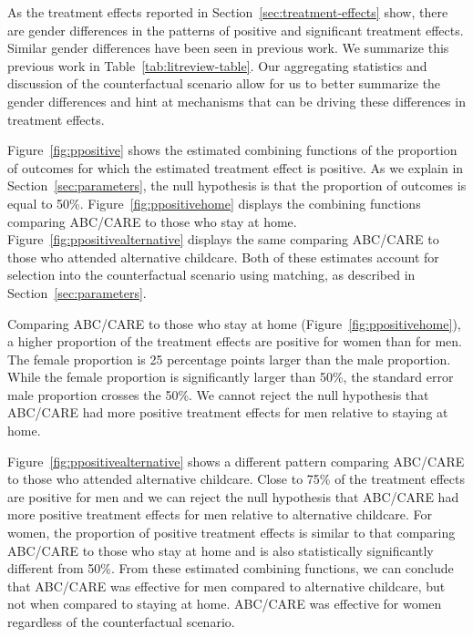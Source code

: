 
As the treatment effects reported in Section~\ref{sec:treatment-effects} show, there are gender differences in the patterns of positive and significant treatment effects. Similar gender differences have been seen in previous work. We summarize this previous work in Table~\ref{tab:litreview-table}. Our aggregating statistics and discussion of the counterfactual scenario allow for us to better summarize the gender differences and hint at mechanisms that can be driving these differences in treatment effects.

Figure~\ref{fig:ppositive} shows the estimated combining functions of the proportion of outcomes for which the estimated treatment effect is positive. As we explain in Section~\ref{sec:parameters}, the null hypothesis is that the proportion of outcomes is equal to 50\%. Figure~\ref{fig:ppositivehome} displays the combining functions comparing ABC/CARE to those who stay at home. Figure~\ref{fig:ppositivealternative} displays the same comparing ABC/CARE to those who attended alternative childcare. Both of these estimates account for selection into the counterfactual scenario using matching, as described in Section~\ref{sec:parameters}.

Comparing ABC/CARE to those who stay at home (Figure~\ref{fig:ppositivehome}), a higher proportion of the treatment effects are positive for women than for men. The female proportion is 25 percentage points larger than the male proportion. While the female proportion is significantly larger than 50\%, the standard error male proportion crosses the 50\%. We cannot reject the null hypothesis that ABC/CARE had more positive treatment effects for men relative to staying at home. 

Figure~\ref{fig:ppositivealternative} shows a different pattern comparing ABC/CARE to those who attended alternative childcare. Close to 75\% of the treatment effects are positive for men and we can reject the null hypothesis that ABC/CARE had more positive treatment effects for men relative to alternative childcare. For women, the proportion of positive treatment effects is similar to that comparing ABC/CARE to those who stay at home and is also statistically significantly different from 50\%. From these estimated combining functions, we can conclude that ABC/CARE was effective for men compared to alternative childcare, but not when compared to staying at home. ABC/CARE was effective for women regardless of the counterfactual scenario. 

